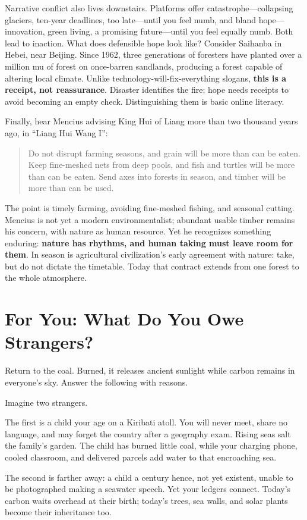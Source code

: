 Narrative conflict also lives downstairs. Platforms offer catastrophe---collapsing glaciers, ten-year deadlines, too late---until you feel numb, and bland hope---innovation, green living, a promising future---until you feel equally numb. Both lead to inaction. What does defensible hope look like? Consider Saihanba in Hebei, near Beijing. Since 1962, three generations of foresters have planted over a million mu of forest on once-barren sandlands, producing a forest capable of altering local climate. Unlike technology-will-fix-everything slogans, \textbf{this is a receipt, not reassurance}. Disaster identifies the fire; hope needs receipts to avoid becoming an empty check. Distinguishing them is basic online literacy.

Finally, hear Mencius advising King Hui of Liang more than two thousand years ago, in ``Liang Hui Wang I'':

\begin{quote}
Do not disrupt farming seasons, and grain will be more than can be eaten. Keep fine-meshed nets from deep pools, and fish and turtles will be more than can be eaten. Send axes into forests in season, and timber will be more than can be used.
\end{quote}
The point is timely farming, avoiding fine-meshed fishing, and seasonal cutting. Mencius is not yet a modern environmentalist; abundant usable timber remains his concern, with nature as human resource. Yet he recognizes something enduring: \textbf{nature has rhythms, and human taking must leave room for them}. In season is agricultural civilization's early agreement with nature: take, but do not dictate the timetable. Today that contract extends from one forest to the whole atmosphere.

\section{For You: What Do You Owe Strangers?}
Return to the coal. Burned, it releases ancient sunlight while carbon remains in everyone's sky. Answer the following with reasons.

Imagine two strangers.

The first is a child your age on a Kiribati atoll. You will never meet, share no language, and may forget the country after a geography exam. Rising seas salt the family's garden. The child has burned little coal, while your charging phone, cooled classroom, and delivered parcels add water to that encroaching sea.

The second is farther away: a child a century hence, not yet existent, unable to be photographed making a seawater speech. Yet your ledgers connect. Today's carbon waits overhead at their birth; today's trees, sea walls, and solar plants become their inheritance too.

